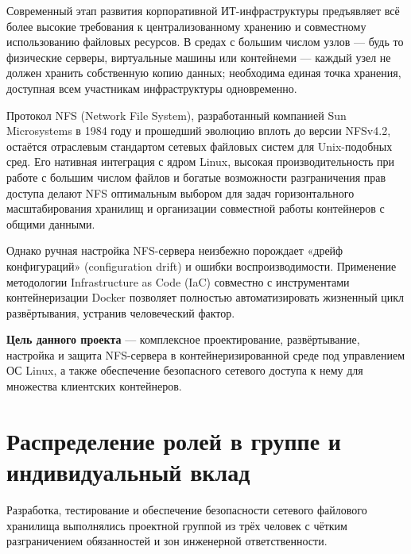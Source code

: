 \documentclass[14pt,a4paper]{extarticle}
\begin{document}
	Современный этап развития корпоративной ИТ-инфраструктуры предъявляет всё более
	высокие требования к централизованному хранению и совместному использованию
	файловых ресурсов. В средах с большим числом узлов --- будь то физические серверы,
	виртуальные машины или контейнеми --- каждый узел не должен хранить собственную копию
	данных; необходима единая точка хранения, доступная всем участникам инфраструктуры
	одновременно.
	
	Протокол NFS (Network File System), разработанный компанией Sun Microsystems в
	1984 году и прошедший эволюцию вплоть до версии NFSv4.2, остаётся отраслевым
	стандартом сетевых файловых систем для Unix-подобных сред. Его нативная интеграция с
	ядром Linux, высокая производительность при работе с большим числом файлов и богатые
	возможности разграничения прав доступа делают NFS оптимальным выбором для задач
	горизонтального масштабирования хранилищ и организации совместной работы контейнеров
	с общими данными.
	
	Однако ручная настройка NFS-сервера неизбежно порождает «дрейф конфигураций»
	(configuration drift) и ошибки воспроизводимости. Применение методологии
	Infrastructure as Code (IaC) совместно с инструментами контейнеризации Docker
	позволяет полностью автоматизировать жизненный цикл развёртывания, устранив
	человеческий фактор.
	
	\textbf{Цель данного проекта} --- комплексное проектирование, развёртывание, настройка
	и защита NFS-сервера в контейнеризированной среде под управлением ОС Linux, а также
	обеспечение безопасного сетевого доступа к нему для множества клиентских контейнеров.
	
	\newpage
	
	\section{Распределение ролей в группе и индивидуальный вклад}
	
	Разработка, тестирование и обеспечение безопасности сетевого файлового хранилища
	выполнялись проектной группой из трёх человек с чётким разграничением обязанностей и
	зон инженерной ответственности.
	
\end{document}
